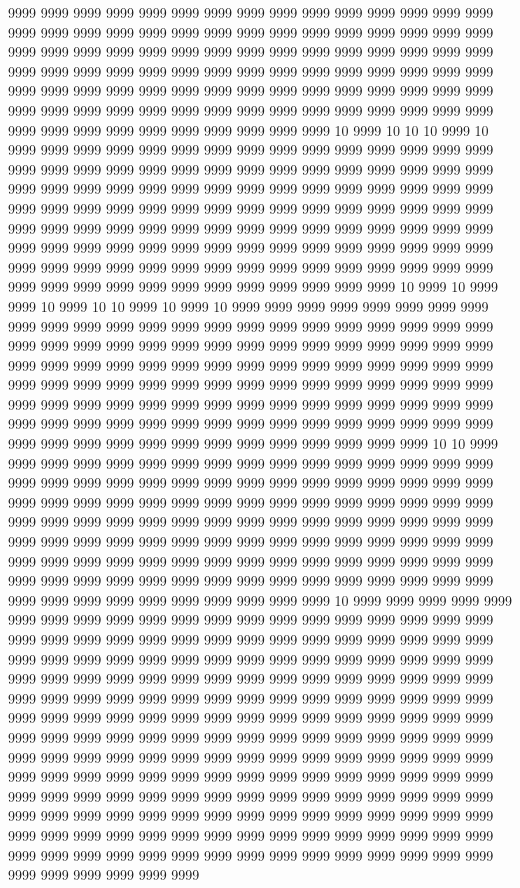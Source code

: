 9999 9999 9999 9999 9999 9999 9999 9999 9999 9999 9999 9999 9999 9999 9999 9999 9999 9999 9999 9999 9999 9999 9999 9999 9999 9999 9999 9999 9999 9999 9999 9999 9999 9999 9999 9999 9999 9999 9999 9999 9999 9999 9999 9999 9999 9999 9999 9999 9999 9999 9999 9999 9999 9999 9999 9999 9999 9999 9999 9999 9999 9999 9999 9999 9999 9999 9999 9999 9999 9999 9999 9999 9999 9999 9999 9999 9999 9999 9999 9999 9999 9999 9999 9999 9999 9999 9999 9999 9999 9999 9999 9999 9999 9999 9999 9999 9999 9999 9999 9999 10 9999 10 10 10 9999 10 9999 9999 9999 9999 9999 9999 9999 9999 9999 9999 9999 9999 9999 9999 9999 9999 9999 9999 9999 9999 9999 9999 9999 9999 9999 9999 9999 9999 9999 9999 9999 9999 9999 9999 9999 9999 9999 9999 9999 9999 9999 9999 9999 9999 9999 9999 9999 9999 9999 9999 9999 9999 9999 9999 9999 9999 9999 9999 9999 9999 9999 9999 9999 9999 9999 9999 9999 9999 9999 9999 9999 9999 9999 9999 9999 9999 9999 9999 9999 9999 9999 9999 9999 9999 9999 9999 9999 9999 9999 9999 9999 9999 9999 9999 9999 9999 9999 9999 9999 9999 9999 9999 9999 9999 9999 9999 9999 9999 9999 9999 9999 9999 9999 9999 9999 9999 9999 10 9999 10 9999 9999 10 9999 10 10 9999 10 9999 10 9999 9999 9999 9999 9999 9999 9999 9999 9999 9999 9999 9999 9999 9999 9999 9999 9999 9999 9999 9999 9999 9999 9999 9999 9999 9999 9999 9999 9999 9999 9999 9999 9999 9999 9999 9999 9999 9999 9999 9999 9999 9999 9999 9999 9999 9999 9999 9999 9999 9999 9999 9999 9999 9999 9999 9999 9999 9999 9999 9999 9999 9999 9999 9999 9999 9999 9999 9999 9999 9999 9999 9999 9999 9999 9999 9999 9999 9999 9999 9999 9999 9999 9999 9999 9999 9999 9999 9999 9999 9999 9999 9999 9999 9999 9999 9999 9999 9999 9999 9999 9999 9999 9999 9999 9999 9999 9999 9999 9999 9999 9999 10 10 9999 9999 9999 9999 9999 9999 9999 9999 9999 9999 9999 9999 9999 9999 9999 9999 9999 9999 9999 9999 9999 9999 9999 9999 9999 9999 9999 9999 9999 9999 9999 9999 9999 9999 9999 9999 9999 9999 9999 9999 9999 9999 9999 9999 9999 9999 9999 9999 9999 9999 9999 9999 9999 9999 9999 9999 9999 9999 9999 9999 9999 9999 9999 9999 9999 9999 9999 9999 9999 9999 9999 9999 9999 9999 9999 9999 9999 9999 9999 9999 9999 9999 9999 9999 9999 9999 9999 9999 9999 9999 9999 9999 9999 9999 9999 9999 9999 9999 9999 9999 9999 9999 9999 9999 9999 9999 9999 9999 9999 9999 9999 9999 9999 9999 9999 9999 10 9999 9999 9999 9999 9999 9999 9999 9999 9999 9999 9999 9999 9999 9999 9999 9999 9999 9999 9999 9999 9999 9999 9999 9999 9999 9999 9999 9999 9999 9999 9999 9999 9999 9999 9999 9999 9999 9999 9999 9999 9999 9999 9999 9999 9999 9999 9999 9999 9999 9999 9999 9999 9999 9999 9999 9999 9999 9999 9999 9999 9999 9999 9999 9999 9999 9999 9999 9999 9999 9999 9999 9999 9999 9999 9999 9999 9999 9999 9999 9999 9999 9999 9999 9999 9999 9999 9999 9999 9999 9999 9999 9999 9999 9999 9999 9999 9999 9999 9999 9999 9999 9999 9999 9999 9999 9999 9999 9999 9999 9999 9999 9999 9999 9999 9999 9999 9999 9999 9999 9999 9999 9999 9999 9999 9999 9999 9999 9999 9999 9999 9999 9999 9999 9999 9999 9999 9999 9999 9999 9999 9999 9999 9999 9999 9999 9999 9999 9999 9999 9999 9999 9999 9999 9999 9999 9999 9999 9999 9999 9999 9999 9999 9999 9999 9999 9999 9999 9999 9999 9999 9999 9999 9999 9999 9999 9999 9999 9999 9999 9999 9999 9999 9999 9999 9999 9999 9999 9999 9999 9999 9999 9999 9999 9999 9999 9999 9999 9999 9999 9999 9999 9999 9999 9999 9999 9999 